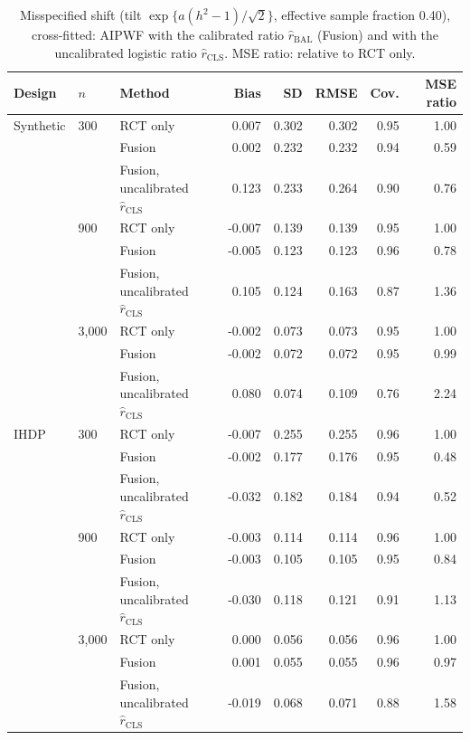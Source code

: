 \begin{table}[h]
\caption{Misspecified shift (tilt $\exp\{a(h^2-1)/\sqrt2\}$, effective sample fraction 0.40), cross-fitted: AIPWF with the calibrated ratio $\hat r_{\mathrm{BAL}}$ (Fusion) and with the uncalibrated logistic ratio $\hat r_{\mathrm{CLS}}$. MSE ratio: relative to RCT only.}
\begin{center}\footnotesize
\begin{tabular}{@{}lllrrrrr@{}}
\toprule
Design & $n$ & Method & Bias & SD & RMSE & Cov. & MSE ratio \\
\midrule
Synthetic & 300 & RCT only & 0.007 & 0.302 & 0.302 & 0.95 & 1.00 \\
 &  & Fusion & 0.002 & 0.232 & 0.232 & 0.94 & 0.59 \\
 &  & Fusion, uncalibrated $\hat r_{\mathrm{CLS}}$ & 0.123 & 0.233 & 0.264 & 0.90 & 0.76 \\
\addlinespace
 & 900 & RCT only & -0.007 & 0.139 & 0.139 & 0.95 & 1.00 \\
 &  & Fusion & -0.005 & 0.123 & 0.123 & 0.96 & 0.78 \\
 &  & Fusion, uncalibrated $\hat r_{\mathrm{CLS}}$ & 0.105 & 0.124 & 0.163 & 0.87 & 1.36 \\
\addlinespace
 & 3{,}000 & RCT only & -0.002 & 0.073 & 0.073 & 0.95 & 1.00 \\
 &  & Fusion & -0.002 & 0.072 & 0.072 & 0.95 & 0.99 \\
 &  & Fusion, uncalibrated $\hat r_{\mathrm{CLS}}$ & 0.080 & 0.074 & 0.109 & 0.76 & 2.24 \\
\midrule
IHDP & 300 & RCT only & -0.007 & 0.255 & 0.255 & 0.96 & 1.00 \\
 &  & Fusion & -0.002 & 0.177 & 0.176 & 0.95 & 0.48 \\
 &  & Fusion, uncalibrated $\hat r_{\mathrm{CLS}}$ & -0.032 & 0.182 & 0.184 & 0.94 & 0.52 \\
\addlinespace
 & 900 & RCT only & -0.003 & 0.114 & 0.114 & 0.96 & 1.00 \\
 &  & Fusion & -0.003 & 0.105 & 0.105 & 0.95 & 0.84 \\
 &  & Fusion, uncalibrated $\hat r_{\mathrm{CLS}}$ & -0.030 & 0.118 & 0.121 & 0.91 & 1.13 \\
\addlinespace
 & 3{,}000 & RCT only & 0.000 & 0.056 & 0.056 & 0.96 & 1.00 \\
 &  & Fusion & 0.001 & 0.055 & 0.055 & 0.96 & 0.97 \\
 &  & Fusion, uncalibrated $\hat r_{\mathrm{CLS}}$ & -0.019 & 0.068 & 0.071 & 0.88 & 1.58 \\
\bottomrule
\end{tabular}
\end{center}
\end{table}
